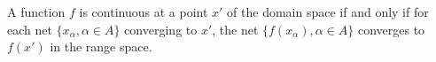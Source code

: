 A function $f$ is continuous at a point $x'$ of the domain space if and only if for each net $\{x_\alpha, \alpha \in A\}$ converging to $x'$, the net $\{f(x_\alpha), \alpha \in A\}$ converges to $f(x')$ in the range space.
